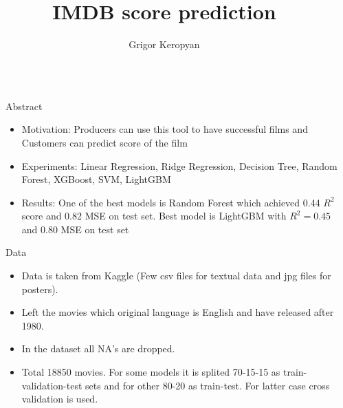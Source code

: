 \documentclass[final]{beamer}
\title{IMDB score prediction} %
\author{Grigor Keropyan} %
\institute{Department of Mathematics and Mechanics at Yerevan State University} %
\newlength{\sepwid}
\newlength{\onecolwid}
\begin{document}

\setlength{\belowcaptionskip}{2ex} %
\setlength\belowdisplayshortskip{2ex} %

\begin{frame}[t] %

\begin{columns}[t] %

\begin{column}{\sepwid}\end{column} %

\begin{column}{\onecolwid} %


\begin{alertblock}{Abstract}
\begin{itemize}
\item Motivation:
Producers can use this tool to have successful films and
Customers can predict score of the film

\item Experiments:
Linear Regression, Ridge Regression, Decision Tree, Random Forest, XGBoost, 
SVM, LightGBM

\item Results:
One of the best models is Random Forest which achieved 0.44 $R^2$ score and 0.82 MSE on test set. 
Best model is LightGBM with $R^2 = 0.45$ and 0.80 MSE  on test set 

\end{itemize}
\end{alertblock}


\begin{block}{Data}
\begin{itemize}
\item Data is taken from Kaggle (Few csv files for textual data and jpg files for posters).
\item Left the movies which original language is English and have released after 1980.
\item In the dataset all NA's are dropped.
\item Total 18850 movies. For some models it is splited 70-15-15 as train-validation-test sets and for other 80-20 as train-test. For latter case cross validation is used.


\end{itemize}
\end{block}
\end{column}
\end{columns}
\end{frame}
\end{document}
